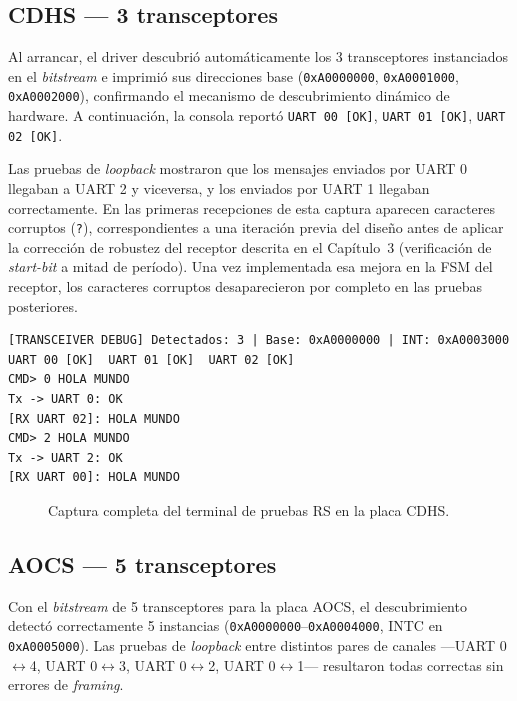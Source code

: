 \subsection{CDHS --- 3 transceptores}

Al arrancar, el driver descubrió automáticamente los 3 transceptores instanciados en el
\textit{bitstream} e imprimió sus direcciones base (\texttt{0xA0000000}, \texttt{0xA0001000},
\texttt{0xA0002000}), confirmando el mecanismo de descubrimiento dinámico de hardware. A
continuación, la consola reportó \texttt{UART 00 [OK]}, \texttt{UART 01 [OK]},
\texttt{UART 02 [OK]}.

Las pruebas de \textit{loopback} mostraron que los mensajes enviados por UART 0 llegaban a
UART 2 y viceversa, y los enviados por UART 1 llegaban correctamente. En las primeras
recepciones de esta captura aparecen caracteres corruptos (\texttt{?}), correspondientes a
una iteración previa del diseño antes de aplicar la corrección de robustez del receptor
descrita en el Capítulo~3 (verificación de \textit{start-bit} a mitad de período). Una
vez implementada esa mejora en la FSM del receptor, los caracteres corruptos desaparecieron
por completo en las pruebas posteriores.

\begin{lstlisting}[caption={Salida de terminal --- prueba RS422/RS485 con la placa CDHS (3 transceptores)}]
[TRANSCEIVER DEBUG] Detectados: 3 | Base: 0xA0000000 | INT: 0xA0003000
UART 00 [OK]  UART 01 [OK]  UART 02 [OK]
CMD> 0 HOLA MUNDO
Tx -> UART 0: OK
[RX UART 02]: HOLA MUNDO
CMD> 2 HOLA MUNDO
Tx -> UART 2: OK
[RX UART 00]: HOLA MUNDO
\end{lstlisting}

\begin{figure}[H]
    \centering
    \caption{Captura completa del terminal de pruebas RS en la placa CDHS.}
    \label{fig:cdhs_rs_terminal}
\end{figure}

\subsection{AOCS --- 5 transceptores}

Con el \textit{bitstream} de 5 transceptores para la placa AOCS, el descubrimiento detectó
correctamente 5 instancias (\texttt{0xA0000000}--\texttt{0xA0004000}, INTC en
\texttt{0xA0005000}). Las pruebas de \textit{loopback} entre distintos pares de canales
---UART 0$\leftrightarrow$4, UART 0$\leftrightarrow$3, UART 0$\leftrightarrow$2,
UART 0$\leftrightarrow$1--- resultaron todas correctas sin errores de \textit{framing}.

